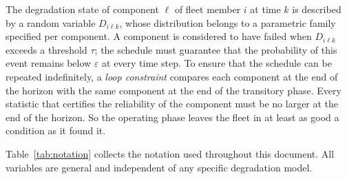 \documentclass[11pt,a4paper]{article}
\theoremstyle{plain}
\theoremstyle{definition}
\theoremstyle{remark}
\begin{document}
The degradation state of component $\ell$ of fleet member $i$ at time $k$ is described by a random variable $D_{i\ell k}$, whose distribution belongs to a parametric family specified per component.
A component is considered to have failed when $D_{i\ell k}$ exceeds a threshold $\tau$; the schedule must guarantee that the probability of this event remains below $\varepsilon$ at every time step.
To ensure that the schedule can be repeated indefinitely, a \emph{loop constraint} compares each component at the end of the horizon with the same component at the end of the transitory phase.
Every statistic that certifies the reliability of the component must be no larger at the end of the horizon.
So the operating phase leaves the fleet in at least as good a condition as it found it.

Table~\ref{tab:notation} collects the notation used throughout this document.
All variables are general and independent of any specific degradation model.
\end{document}
